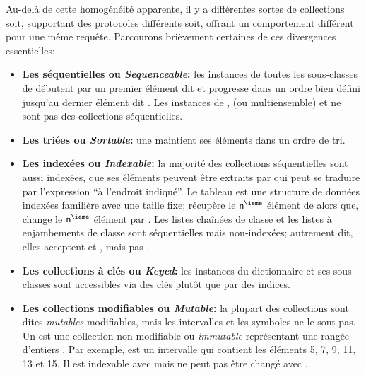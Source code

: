\documentclass[a4paper,10pt,twoside]{book}
\begin{document}
Au-delà de cette homogénéité apparente,
il y a différentes sortes de collections soit, supportant des protocoles 
différents soit, offrant un comportement différent pour une même requête.
Parcourons brièvement certaines de ces divergences essentielles:

\begin{itemize}
  \item {\bf Les séquentielles ou \emph{Sequenceable}:}
  les instances de toutes les sous-classes de  
débutent par un premier élément dit  et progresse dans un ordre bien défini jusqu'au
dernier élément dit .
Les instances de ,  (ou multiensemble) et  ne sont pas des collections séquentielles.

  \item {\bf Les triées ou \emph{Sortable}:}
une  maintient ses éléments dans un ordre de 
tri.

  \item {\bf Les indexées ou \emph{Indexable}:}
la majorité des collections séquentielles sont aussi indexées, \cad
que ses éléments peuvent être extraits par 	
 qui peut se traduire par l'expression ``à l'endroit indiqué''.
	Le tableau  est une structure de données indexées familière avec une taille fixe;   récupère le
 $\mbox{\ct{n}}^{\ieme}$ élément de  alors que, 
 change le $\mbox{\ct{n}}^{\ieme}$ élément 
par .
	Les listes chaînées de classe  et
les listes à enjambements de classe  sont séquentielles mais non-indexées; autrement dit, elles acceptent  et , mais pas .

  \item {\bf Les collections à clés ou \emph{Keyed}:}
	les instances du dictionnaire  et ses sous-classes
sont accessibles via des clés plutôt que par des indices.

  \item {\bf Les collections modifiables ou \emph{Mutable}:}
  	la plupart des collections sont dites \emph{mutables} \cad modifiables, mais les intervalles  et les symboles  ne le sont pas.
	Un  est une collection non-modifiable ou \emph{immutable} représentant une rangée d'entiers .  Par exemple, 
 est un intervalle  qui contient les 
éléments 5, 7, 9, 11, 13 et 15.  Il est indexable avec  mais ne peut pas être changé avec .


\end{itemize}
\end{document}
